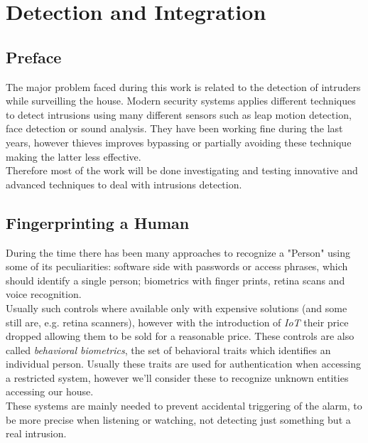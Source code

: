 \chapter{Detection and Integration}
\label{chap3}

\section{Preface}
The major problem faced during this work is related
to the detection of intruders while surveilling the house.
Modern security systems applies different techniques to detect intrusions
using many different sensors such as leap motion detection, face detection
or sound analysis. They have been working fine during the last years, however
thieves improves bypassing or partially avoiding these technique making the latter
less effective.\\
Therefore most of the work will be done investigating and testing innovative and
advanced techniques to deal with intrusions detection.

\section{Fingerprinting a Human}

During the time there has been many approaches to recognize a "Person"
using some of its peculiarities: software side with passwords or access phrases,
which should identify a single person; biometrics with finger prints, retina scans
and voice recognition.\\
Usually such controls where available only with expensive solutions (and some still are, e.g. retina
scanners), however with the introduction of \textit{IoT} their price dropped allowing
them to be sold for a reasonable price. These controls are also called \textit{behavioral biometrics},
the set of behavioral traits which identifies an individual person. Usually these traits are
used for authentication when accessing a restricted system, however we'll consider
these to recognize unknown entities accessing our house. \\
These systems are mainly needed to prevent accidental triggering of the alarm, to be more
precise when listening or watching, not detecting just something but a real intrusion.

